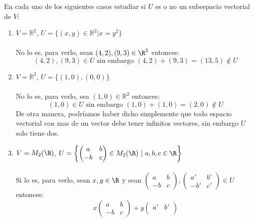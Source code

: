 \begin{ejercicio}En cada uno de los siguientes casos estudiar si $U$ es o no un subespacio vectorial de $V$:
	\begin{enumerate}[label=\alph*)]
		\item $V = \mathbb{R}^2$, $U = \{ (x,y) \in \mathbb{R}^2 | x = y^2 \}$
		      \\ \\ No lo es, para verlo, sean $(4,2), (9,3) \in \R^2$ entonces:
		      \begin{equation*}
			      (4,2), (9,3) \in U \text{ sin embargo } (4,2)+(9,3)=(13,5) \notin U
		      \end{equation*}
		\item $V = \mathbb{R}^2$, $U = \{ (1,0), (0,0) \}$ \\ \\ No lo es, para verlo, sea $(1,0) \in \mathbb{R}^2$ entonces:
		      \begin{equation*}
			      (1,0) \in U \text{ sin embargo } (1,0)+(1,0)=(2,0) \notin U
		      \end{equation*}
		      De otra manera, podríamos haber dicho simplemente que todo espacio vectorial con mas de un vector debe
		      tener infinitos vectores, sin embargo $U$ solo tiene dos.
		\item $V = M_2 (\R) $, $U = \left\{
			      \begin{pmatrix}
				      a  & b \\
				      -b & c
			      \end{pmatrix}
			      \in M_2 (\R) \ | \ a,b,c \in \R \right\}$ \\ \\ Si lo es, para verlo, sean $x,y \in \R $ y sean $\begin{pmatrix}
				      a  & b \\
				      -b & c
			      \end{pmatrix},
			      \begin{pmatrix}
				      a'  & b' \\
				      -b' & c'
			      \end{pmatrix} \in U$ entonces:
		      \begin{equation*}
			      x \begin{pmatrix}
				      a  & b \\
				      -b & c
			      \end{pmatrix} + y \begin{pmatrix}
				      a'  & b' \\

\end{pmatrix}
\end{equation*}
\end{enumerate}
\end{ejercicio}
